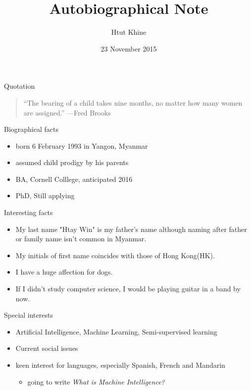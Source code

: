 \documentclass{beamer}
\title{Autobiographical Note}
\author{Htut Khine}
\institute{Cornell College}
\date{23 November 2015}
\begin{document}
\begin{frame}
  \titlepage
\end{frame}

\begin{frame}{Quotation}
\begin{quotation}
\noindent
``The bearing of a child takes nine months, no matter how many women are assigned.''
  \flushright
  ---Fred Brooks
  \end{quotation}
\end{frame}

\begin{frame}{Biographical facts}
\begin{itemize}
  \item born 6 February 1993 in Yangon, Myanmar
  \item assumed child prodigy by his parents
  \item BA, Cornell Colllege, anticipated 2016
  \item PhD, Still applying
  \end{itemize}
\end{frame}

\begin{frame}{Interesting facts}
\begin{itemize}
  \item My last name "Htay Win" is my father's name although naming after father or family name isn't common in Myanmar.   
  \item My initials of first name coincides with those of Hong Kong(HK).
  \item I have a huge affection for dogs.  
  \item If I didn't study computer science, I would be playing guitar in a band by now. 
  \end{itemize}
\end{frame}

\begin{frame}{Special interests}
\begin{itemize}
  \item Artificial Intelligence, Machine Learning, Semi-supervised learning
  \item Current social issues 
  \item keen interest for languages, especially Spanish, French and Mandarin 
  \begin{itemize}
    \item going to write \emph{What is Machine Intelligence?}
    \end{itemize}
  \end{itemize}
\end{frame}
\end{document}
